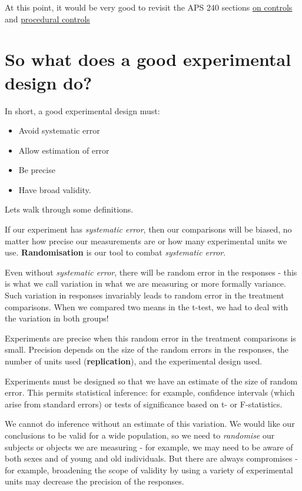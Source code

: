\documentclass[
]{book}
\providecommand{\tightlist}{%
  \setlength{\itemsep}{0pt}\setlength{\parskip}{0pt}}
\begin{document}
At this point, it would be very good to revisit the APS 240 sections \href{https://dzchilds.github.io/stats-for-bio/principles-experimental-design.html\#experimental-control}{on controls} and \href{https://dzchilds.github.io/stats-for-bio/principles-experimental-design.html\#EXPT-DESIGN-PROCEDURAL-CONTROLS}{procedural controls}

\hypertarget{so-what-does-a-good-experimental-design-do}{%
\section{So what does a good experimental design do?}\label{so-what-does-a-good-experimental-design-do}}

In short, a good experimental design must:

\begin{itemize}
\tightlist
\item
  Avoid systematic error
\item
  Allow estimation of error
\item
  Be precise
\item
  Have broad validity.
\end{itemize}

Lets walk through some definitions.

If our experiment has \emph{systematic error}, then our comparisons will be biased, no matter how precise our measurements are or how many experimental units we use. \textbf{Randomisation} is our tool to combat \emph{systematic error}.

Even without \emph{systematic error}, there will be random error in the responses - this is what we call variation in what we are measuring or more formally variance. Such variation in responses invariably leads to random error in the treatment comparisons. When we compared two means in the t-test, we had to deal with the variation in both groups!

Experiments are precise when this random error in the treatment comparisons is small. Precision depends on the size of the random errors in the responses, the number of units used (\textbf{replication}), and the experimental design used.

Experiments must be designed so that we have an estimate of the size of random error. This permits statistical inference: for example, confidence intervals (which arise from standard errors) or tests of significance based on t- or F-statistics.

We cannot do inference without an estimate of this variation. We would like our conclusions to be valid for a wide population, so we need to \emph{randomise} our subjects or objects we are measuring - for example, we may need to be aware of both sexes and of young and old individuals. But there are always compromises - for example, broadening the scope of validity by using a variety of experimental units may decrease the precision of the responses.
\end{document}
